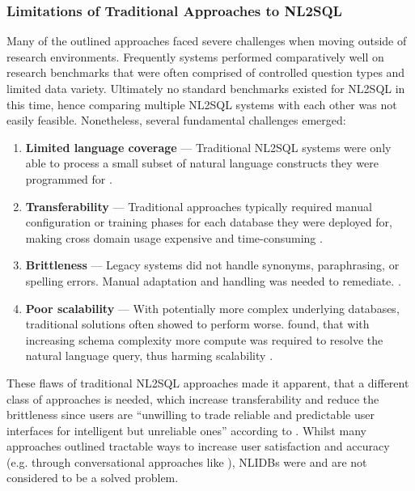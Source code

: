 \subsubsection{Limitations of Traditional Approaches to NL2SQL}

Many of the outlined approaches faced severe challenges when moving outside
of research environments. Frequently systems performed comparatively well on
research benchmarks that were often comprised of controlled question types and
limited data variety. Ultimately no standard benchmarks existed for NL2SQL in
this time, hence comparing multiple NL2SQL systems with each other was not
easily feasible. Nonetheless, several fundamental challenges emerged:

\begin{enumerate}
    \item \textbf{Limited language coverage} — Traditional NL2SQL systems were
        only able to process a small subset of natural language constructs
        they were programmed for \citep{StringKernels, UnnaturalQueryLanguage,
        Lunar, Ladder}.
    \item \textbf{Transferability} — Traditional approaches typically required
        manual configuration or training phases for each database they were
        deployed for, making cross domain usage expensive and time-consuming
        \citep{NLIDBs, Lunar}.
    \item \textbf{Brittleness} — Legacy systems did not handle synonyms,
        paraphrasing, or spelling errors. Manual adaptation and handling was
        needed to remediate. \citep{StringKernels, SQLizer}.
    \item \textbf{Poor scalability} — With potentially more complex underlying
        databases, traditional solutions often showed to perform worse.
        \citeauthor*{GraphMatching} found, that with increasing schema
        complexity more compute was required to resolve the natural language
        query, thus harming scalability \citep{GraphMatching}.
\end{enumerate}

These flaws of traditional NL2SQL approaches made it apparent, that a different
class of approaches is needed, which increase transferability and reduce the
brittleness since users are ``unwilling to trade reliable and predictable user
interfaces for intelligent but unreliable ones'' according to
\cite{NLIDBTheory}. Whilst many approaches outlined tractable ways to increase
user satisfaction and accuracy (e.g. through conversational approaches like
\cite{Rendezvous}), NLIDBs were and are not considered to be a solved problem.
